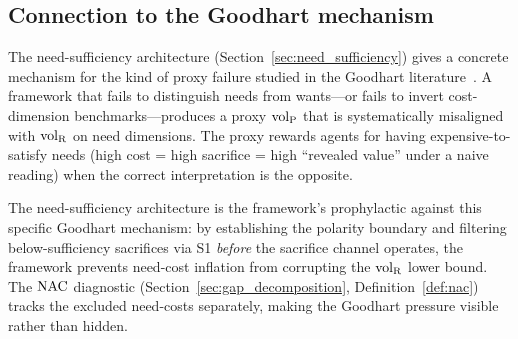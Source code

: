 \subsection{Connection to the Goodhart mechanism}

The need-sufficiency architecture
(Section~\ref{sec:need_sufficiency}) gives a concrete mechanism for
the kind of proxy failure studied in the Goodhart
literature~\citep{strathern1997improving,manheim2019categorizing}.
A framework that fails to distinguish needs from wants---or fails
to invert cost-dimension benchmarks---produces a proxy ${\operatorname{vol}_{\mathrm{P}}}$
that is systematically misaligned with ${\operatorname{vol}_{\mathrm{R}}}$ on need dimensions.
The proxy rewards agents for having expensive-to-satisfy needs
(high cost = high sacrifice = high ``revealed value'' under a
naive reading) when the correct interpretation is the opposite.

The need-sufficiency architecture is the framework's prophylactic
against this specific Goodhart mechanism: by establishing the
polarity boundary and filtering below-sufficiency sacrifices via
S1 \emph{before} the sacrifice channel operates, the framework
prevents need-cost inflation from corrupting the ${\operatorname{vol}_{\mathrm{R}}}$ lower
bound.  The $\mathrm{NAC}$ diagnostic
(Section~\ref{sec:gap_decomposition},
Definition~\ref{def:nac}) tracks the excluded need-costs
separately, making the Goodhart pressure visible rather than
hidden.
